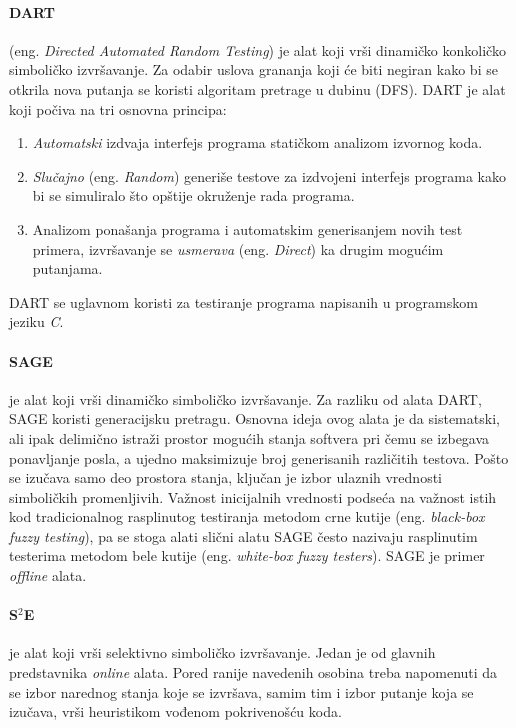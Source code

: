 \documentclass[12pt,oneside]{memoir}
\begin{document}
\paragraph{DART}\cite{dart} (eng. \textit{Directed Automated Random Testing}) je alat koji vrši dinamičko konkoličko simboličko izvršavanje. Za odabir uslova grananja koji će biti negiran kako bi se otkrila nova putanja se koristi algoritam pretrage u dubinu (DFS). DART je alat koji počiva na tri osnovna principa:
\begin{enumerate}
    \item\textit{Automatski} izdvaja interfejs programa statičkom analizom izvornog koda.
    
    \item\textit{Slučajno} (eng. \textit{Random}) generiše testove za izdvojeni interfejs programa kako bi se simuliralo što opštije okruženje rada programa.
    
    \item Analizom ponašanja programa i automatskim generisanjem novih test primera, izvršavanje se \textit{usmerava} (eng. \textit{Direct}) ka drugim mogućim putanjama.
\end{enumerate}

\noindent DART se uglavnom koristi za testiranje programa napisanih u programskom jeziku \textit{C}.

\paragraph{SAGE}\cite{sage} je alat koji vrši dinamičko simboličko izvršavanje. Za razliku od alata DART, SAGE koristi generacijsku pretragu. Osnovna ideja ovog alata je da sistematski, ali ipak delimično istraži prostor mogućih stanja softvera pri čemu se izbegava ponavljanje posla, a ujedno maksimizuje broj generisanih različitih testova. Pošto se izučava samo deo prostora stanja, ključan je izbor ulaznih vrednosti simboličkih promenljivih. Važnost inicijalnih vrednosti podseća na važnost istih kod tradicionalnog rasplinutog testiranja metodom crne kutije (eng. \textit{black-box fuzzy testing}), pa se stoga alati slični alatu SAGE često nazivaju rasplinutim testerima metodom bele kutije (eng. \textit{white-box fuzzy testers}). SAGE je primer \textit{offline} alata. 

\paragraph{S$^2$E}\cite{s2e} je alat koji vrši selektivno simboličko izvršavanje. Jedan je od glavnih predstavnika \textit{online} alata. Pored ranije navedenih osobina treba napomenuti da se izbor narednog stanja koje se izvršava, samim tim i izbor putanje koja se izučava, vrši heuristikom vođenom pokrivenošću koda. 
\end{document}
